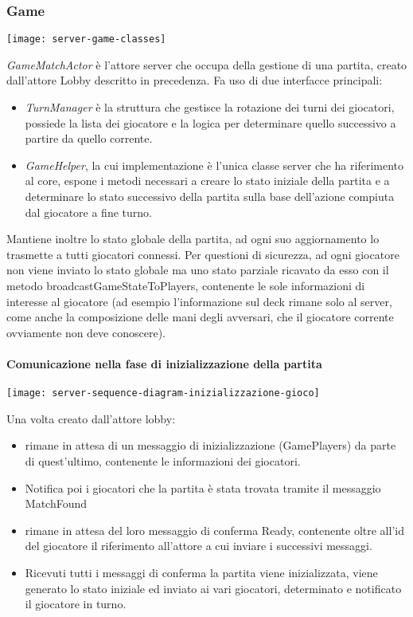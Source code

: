 \subsubsection{Game}
\begin{center}
    \texttt{[image: server-game-classes]}
\end{center}
\textit{GameMatchActor} è l’attore server che occupa della gestione di una partita, creato dall’attore Lobby descritto in precedenza.
Fa uso di due interfacce principali:
\begin{itemize}
    \item \textit{TurnManager} è la struttura che gestisce la rotazione dei turni dei giocatori, possiede la lista dei giocatore e la logica per determinare quello successivo a partire da quello corrente.
    \item \textit{GameHelper}, la cui implementazione è l’unica classe server che ha riferimento al core, espone i metodi necessari a creare lo stato iniziale della partita e a determinare lo stato successivo della partita sulla base dell’azione compiuta dal giocatore a fine turno.
\end{itemize}
Mantiene inoltre lo stato globale della partita, ad ogni suo aggiornamento lo trasmette a tutti giocatori connessi.
Per questioni di sicurezza, ad ogni giocatore non viene inviato lo stato globale ma uno stato parziale ricavato da esso con il metodo broadcastGameStateToPlayers, contenente le sole informazioni di interesse al giocatore (ad esempio l’informazione sul deck rimane solo al server, come anche la composizione delle mani degli avversari, che il giocatore corrente ovviamente non deve conoscere).

\paragraph{Comunicazione nella fase di inizializzazione della partita}
\begin{center}
    \texttt{[image: server-sequence-diagram-inizializzazione-gioco]}
\end{center}
Una volta creato dall’attore lobby:
\begin{itemize}
    \item rimane in attesa di un messaggio di inizializzazione (GamePlayers) da parte di quest’ultimo, contenente le informazioni dei giocatori.
    \item Notifica poi i giocatori che la partita è stata trovata tramite il messaggio MatchFound
    \item rimane in attesa del loro messaggio di conferma Ready, contenente oltre all’id del giocatore il riferimento all’attore a cui inviare i successivi messaggi.
    \item Ricevuti tutti i messaggi di conferma la partita viene inizializzata, viene generato lo stato iniziale ed inviato ai vari giocatori, determinato e notificato il giocatore in turno.
\end{itemize}

